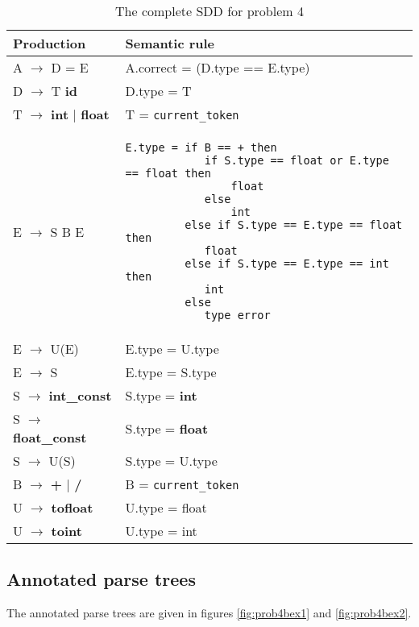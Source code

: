 \documentclass[twoside]{article}
\begin{document}
\begin{multicols}{2}
    \begin{table*}[b]
        \centering
        \begin{tabular}{l|p{12cm}}
            Production & Semantic rule \\ \hline
            A $\rightarrow$ D = E & A.correct = (D.type == E.type) \\ \hline
            D $\rightarrow$ T \textbf{id} & D.type = T \\ \hline
            T $\rightarrow$ \textbf{int} | \textbf{float} & T = \texttt{current\_token} \\ \hline
            E $\rightarrow$ S B E &
\begin{lstlisting}
E.type = if B == + then
            if S.type == float or E.type == float then
                float
            else
                int
         else if S.type == E.type == float then
            float
         else if S.type == E.type == int then
            int
         else
            type_error
\end{lstlisting} \\ \hline
            E $\rightarrow$ U(E) & E.type = U.type \\ \hline
            E $\rightarrow$ S & E.type = S.type \\ \hline
            S $\rightarrow$ \textbf{int\_const} & S.type = \textbf{int} \\ \hline
            S $\rightarrow$ \textbf{float\_const} & S.type = \textbf{float} \\ \hline
            S $\rightarrow$ U(S) & S.type = U.type \\ \hline
            B $\rightarrow$ \textbf{+} | \textbf{/} & B = \texttt{current\_token} \\ \hline
            U $\rightarrow$ \textbf{tofloat} & U.type = float \\ \hline
            U $\rightarrow$ \textbf{toint} & U.type = int \\ \hline
        \end{tabular}
        \caption{The complete SDD for problem 4} \label{tab:prob4sdd}
    \end{table*}


    \subsection{Annotated parse trees}

    The annotated parse trees are given in figures \ref{fig:prob4bex1} and \ref{fig:prob4bex2}.


\end{multicols}
\end{document}
